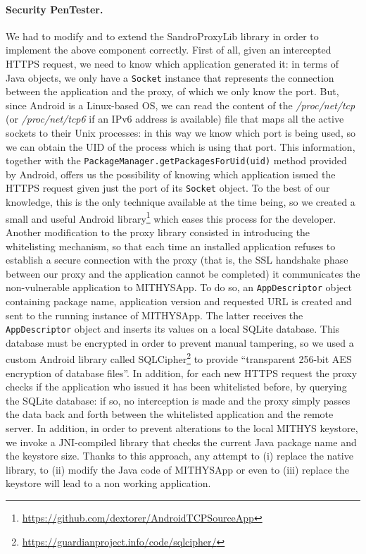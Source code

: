 \documentclass[english]{llncs}
\begin{document}
\paragraph{Security PenTester.} We had to modify and to extend the SandroProxyLib library in order to implement the above component correctly. First of all, given an intercepted HTTPS request, we need to know which application generated it: in terms of Java objects, we only have a \verb+Socket+ instance that represents the connection between the application and the proxy, of which we only know the port. But, since Android is a Linux-based OS, we can read the content of the \textit{/proc/net/tcp} (or \textit{/proc/net/tcp6} if an IPv6 address is available) file that maps all the active sockets to their Unix processes: in this way we know which port is being used, so we can obtain the UID of the process which is using that port. This information, together with the \verb+PackageManager.getPackagesForUid(uid)+ method provided by Android, offers us the possibility of knowing which application issued the HTTPS request given just the port of its \verb+Socket+ object. To the best of our knowledge, this is the only technique available at the time being, so we created a small and useful Android library\footnote{\url{https://github.com/dextorer/AndroidTCPSourceApp}} which eases this process for the developer.
Another modification to the proxy library consisted in introducing the whitelisting mechanism, so that each time an installed application refuses to establish a secure connection with the proxy (that is, the SSL handshake phase between our proxy and the application cannot be completed) it communicates the non-vulnerable application to MITHYSApp. To do so, an \verb+AppDescriptor+ object containing package name, application version and requested URL is created and sent to the running instance of MITHYSApp. The latter receives the \verb+AppDescriptor+ object and inserts its values on a local SQLite database. This database must be encrypted in order to prevent manual tampering, so we used a custom Android library called SQLCipher\footnote{\url{https://guardianproject.info/code/sqlcipher/}} to provide ``transparent 256-bit AES encryption of database files''. In addition, for each new HTTPS request the proxy checks if the application who issued it has been whitelisted before, by querying the SQLite database: if so, no interception is made and the proxy simply passes the data back and forth between the whitelisted application and the remote server.
In addition, in order to prevent alterations to the local MITHYS keystore, we invoke a JNI-compiled library that checks the current Java package name and the keystore size. Thanks to this approach, any attempt to (i) replace the native library, to (ii) modify the Java code of MITHYSApp or even to (iii) replace the keystore will lead to a non working application.
\end{document}
